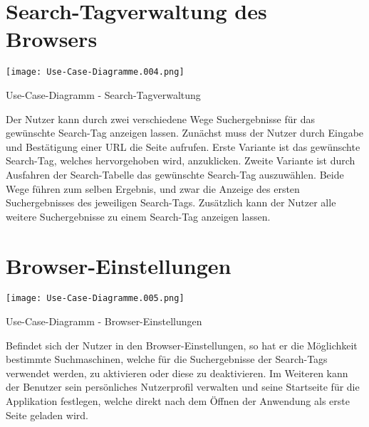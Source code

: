 \section{Search-Tagverwaltung des Browsers}

\texttt{[image: Use-Case-Diagramme.004.png]}
	\caption{Use-Case-Diagramm - Search-Tagverwaltung}
	\label{fig:Search-Tagverwaltung}

Der Nutzer kann durch zwei verschiedene Wege Suchergebnisse für das gewünschte Search-Tag anzeigen lassen. Zunächst muss der Nutzer durch Eingabe und Bestätigung einer URL die Seite aufrufen. Erste Variante ist das gewünschte Search-Tag, welches hervorgehoben wird, anzuklicken. Zweite Variante ist durch Ausfahren der Search-Tabelle das gewünschte Search-Tag auszuwählen. Beide Wege führen zum selben Ergebnis, und zwar die Anzeige des ersten Suchergebnisses des jeweiligen Search-Tags. Zusätzlich kann der Nutzer alle weitere Suchergebnisse zu einem Search-Tag anzeigen lassen.

\section{Browser-Einstellungen}

\texttt{[image: Use-Case-Diagramme.005.png]}
	\caption{Use-Case-Diagramm - Browser-Einstellungen}
	\label{fig:Browser-Einstellungen}

Befindet sich der Nutzer in den Browser-Einstellungen, so hat er die Möglichkeit bestimmte Suchmaschinen, welche für die Suchergebnisse der Search-Tags verwendet werden, zu aktivieren oder diese zu deaktivieren. Im Weiteren kann der Benutzer sein persönliches Nutzerprofil verwalten und seine Startseite für die Applikation festlegen, welche direkt nach dem Öffnen der Anwendung als erste Seite geladen wird.
